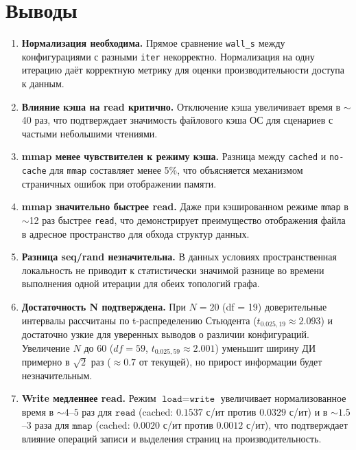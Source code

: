 \documentclass[12pt,a4paper]{article}
\begin{document}
\section{Выводы}
\begin{enumerate}
    \item \textbf{Нормализация необходима.} Прямое сравнение \texttt{wall\_s} между конфигурациями с разными \texttt{iter} некорректно. Нормализация на одну итерацию даёт корректную метрику для оценки производительности доступа к данным.
    \item \textbf{Влияние кэша на read критично.} Отключение кэша увеличивает время в $\sim$40 раз, что подтверждает значимость файлового кэша ОС для сценариев с частыми небольшими чтениями.
    \item \textbf{mmap менее чувствителен к режиму кэша.} Разница между \texttt{cached} и \texttt{no-cache} для \texttt{mmap} составляет менее 5\%, что объясняется механизмом страничных ошибок при отображении памяти.
    \item \textbf{mmap значительно быстрее read.} Даже при кэшированном режиме \texttt{mmap} в $\sim$12 раз быстрее \texttt{read}, что демонстрирует преимущество отображения файла в адресное пространство для обхода структур данных.
    \item \textbf{Разница seq/rand незначительна.} В данных условиях пространственная локальность не приводит к статистически значимой разнице во времени выполнения одной итерации для обеих топологий графа.
    \item \textbf{Достаточность N подтверждена.} При $N = 20$ (df = 19) доверительные интервалы рассчитаны по t-распределению Стьюдента ($t_{0.025,19} \approx 2.093$) и достаточно узкие для уверенных выводов о различии конфигураций. Увеличение $N$ до 60 ($df = 59$, $t_{0.025,59} \approx 2.001$) уменьшит ширину ДИ примерно в $\sqrt{2}$ раз ($\approx 0.7$ от текущей), но прирост информации будет незначительным.
    \item \textbf{Write медленнее read.} Режим $\texttt{load}=\texttt{write}$ увеличивает нормализованное время в $\sim 4$--$5$ раз для $\texttt{read}$ (cached: $0.1537$ с/ит против $0.0329$ с/ит) и в $\sim 1.5$--$3$ раза для $\texttt{mmap}$ (cached: $0.0020$ с/ит против $0.0012$ с/ит), что подтверждает влияние операций записи и выделения страниц на производительность.
\end{enumerate}
\end{document}
